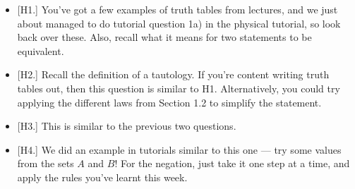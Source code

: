 \documentclass[
  10pt,
  a4paper]{article}
\providecommand{\tightlist}{%
  \setlength{\itemsep}{0pt}\setlength{\parskip}{0pt}}
\theoremstyle{plain}
\theoremstyle{definition}
\theoremstyle{plain}
\theoremstyle{plain}
\theoremstyle{plain}
\theoremstyle{plain}
\theoremstyle{definition}
\theoremstyle{definition}
\newtheorem*{Order Axioms*}{Order Axioms}\newtheorem{Order Axioms}{Order Axioms}[section]
\theoremstyle{remark}
\theoremstyle{remark}
\begin{document}
\begin{itemize}
\tightlist
\item
  {[}H1.{]} You've got a few examples of truth tables from lectures, and we just about managed to do tutorial question 1a) in the physical tutorial, so look back over these. Also, recall what it means for two statements to be equivalent.
\item
  {[}H2.{]} Recall the definition of a tautology. If you're content writing truth tables out, then this question is similar to H1. Alternatively, you could try applying the different laws from Section 1.2 to simplify the statement.
\item
  {[}H3.{]} This is similar to the previous two questions.
\item
  {[}H4.{]} We did an example in tutorials similar to this one --- try some values from the sets \(A\) and \(B\)! For the negation, just take it one step at a time, and apply the rules you've learnt this week.
\end{itemize}
\end{document}
